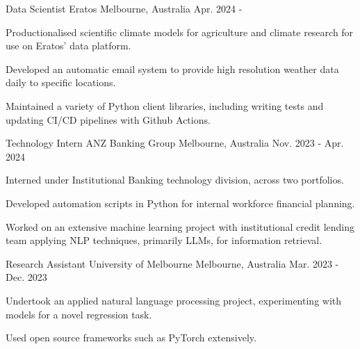 

\begin{cventries}


\cventry
    {Data Scientist} %
    {Eratos} %
    {Melbourne, Australia} %
    {Apr. 2024 - } %
    {
      \begin{cvitems}
        \item Productionalised scientific climate models for agriculture and climate research for use on Eratos' data platform.
        \item Developed an automatic email system to provide high resolution weather data daily to specific locations.
        \item Maintained a variety of Python client libraries, including writing tests and updating CI/CD pipelines with Github Actions.
      \end{cvitems}
    }

\cventry
    {Technology Intern} %
    {ANZ Banking Group} %
    {Melbourne, Australia} %
    {Nov. 2023 - Apr. 2024} %
    {
      \begin{cvitems} %
        \item Interned under Institutional Banking technology division, across two portfolios.
        \item Developed automation scripts in Python for internal workforce financial planning.
        \item Worked on an extensive machine learning project with institutional credit lending team applying NLP techniques, primarily LLMs, for information retrieval.
      \end{cvitems}
    }

\cventry
    {Research Assistant} %
    {University of Melbourne} %
    {Melbourne, Australia} %
    {Mar. 2023 - Dec. 2023} %
    {
      \begin{cvitems} %
        \item Undertook an applied natural language processing project, experimenting with models for a novel regression task.
        \item Used open source frameworks such as PyTorch extensively.
      \end{cvitems}
    }


\end{cventries}
